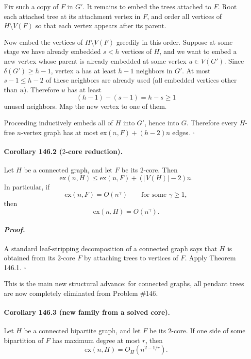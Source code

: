 Fix such a copy of $F$ in $G'$. It remains to embed the trees attached to $F$.
Root each attached tree at its attachment vertex in $F$, and order all vertices of $H\setminus V(F)$
so that each vertex appears after its parent.

Now embed the vertices of $H\setminus V(F)$ greedily in this order.
Suppose at some stage we have already embedded $s<h$ vertices of $H$, and we want to embed a new
vertex whose parent is already embedded at some vertex $u\in V(G')$.
Since $\delta(G')\ge h-1$, vertex $u$ has at least $h-1$ neighbors in $G'$.
At most $s-1\le h-2$ of these neighbors are already used (all embedded vertices other than $u$).
Therefore $u$ has at least
\[
(h-1)-(s-1)=h-s\ge 1
\]
unused neighbors. Map the new vertex to one of them.

Proceeding inductively embeds all of $H$ into $G'$, hence into $G$.
Therefore every $H$-free $n$-vertex graph has at most $\mathrm{ex}(n,F)+(h-2)n$ edges. \hfill $\square$

\paragraph{\textbf{Corollary 146.2 ($2$-core reduction).}}
Let $H$ be a connected graph, and let $F$ be its $2$-core. Then
\[
\mathrm{ex}(n,H)\le \mathrm{ex}(n,F)+(|V(H)|-2)n.
\]
In particular, if
\[
\mathrm{ex}(n,F)=O(n^\gamma)
\qquad\text{for some }\gamma\ge 1,
\]
then
\[
\mathrm{ex}(n,H)=O(n^\gamma).
\]

\paragraph{\textit{Proof.}}
A standard leaf-stripping decomposition of a connected graph says that $H$ is obtained from its
$2$-core $F$ by attaching trees to vertices of $F$. Apply Theorem 146.1. \hfill $\square$

\medskip

This is the main new structural advance: for connected graphs, all pendant trees are now completely
eliminated from Problem \#146.

\paragraph{\textbf{Corollary 146.3 (new family from a solved core).}}
Let $H$ be a connected bipartite graph, and let $F$ be its $2$-core. If one side of some bipartition
of $F$ has maximum degree at most $r$, then
\[
\mathrm{ex}(n,H)=O_H(n^{2-1/r}).
\]

